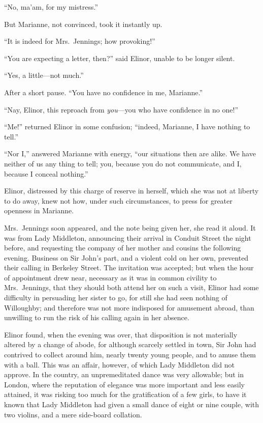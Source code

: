 \documentclass{article}
\begin{document}
``No, ma'am, for my mistress.''

But Marianne, not convinced, took it instantly up.

``It is indeed for Mrs.\ Jennings; how provoking!''

``You are expecting a letter, then?'' said Elinor,
unable to be longer silent.

``Yes, a little---not much.''

After a short pause.  ``You have no confidence
in me, Marianne.''

``Nay, Elinor, this reproach from \emph{you}---you who have
confidence in no one!''

``Me!'' returned Elinor in some confusion; ``indeed,
Marianne, I have nothing to tell.''

``Nor I,'' answered Marianne with energy, ``our situations
then are alike.  We have neither of us any thing to tell;
you, because you do not communicate, and I, because
I conceal nothing.''

Elinor, distressed by this charge of reserve in herself,
which she was not at liberty to do away, knew not how,
under such circumstances, to press for greater openness
in Marianne.

Mrs.\ Jennings soon appeared, and the note being
given her, she read it aloud.  It was from Lady Middleton,
announcing their arrival in Conduit Street the night before,
and requesting the company of her mother and cousins
the following evening.  Business on Sir John's part,
and a violent cold on her own, prevented their calling
in Berkeley Street.  The invitation was accepted;
but when the hour of appointment drew near, necessary as
it was in common civility to Mrs.\ Jennings, that they
should both attend her on such a visit, Elinor had some
difficulty in persuading her sister to go, for still
she had seen nothing of Willoughby; and therefore was
not more indisposed for amusement abroad, than unwilling
to run the risk of his calling again in her absence.

Elinor found, when the evening was over,
that disposition is not materially altered by a change
of abode, for although scarcely settled in town,
Sir John had contrived to collect around him, nearly twenty
young people, and to amuse them with a ball.  This was
an affair, however, of which Lady Middleton did not approve.
In the country, an unpremeditated dance was very allowable;
but in London, where the reputation of elegance was more
important and less easily attained, it was risking too much
for the gratification of a few girls, to have it known that
Lady Middleton had given a small dance of eight or nine couple,
with two violins, and a mere side-board collation.
\end{document}
